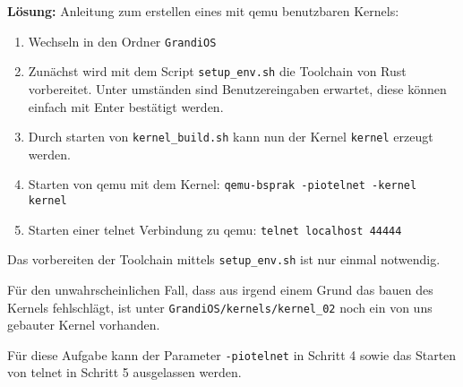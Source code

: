 \begin{description}
\textbf{Lösung:}
Anleitung zum erstellen eines mit qemu benutzbaren Kernels:
\begin{enumerate}
	\item Wechseln in den Ordner \texttt{GrandiOS}
	\item Zunächst wird mit dem Script \texttt{setup\_env.sh} die Toolchain von Rust vorbereitet. Unter umständen sind Benutzereingaben erwartet, diese können einfach mit Enter bestätigt werden.
	\item Durch starten von \texttt{kernel\_build.sh} kann nun der Kernel \texttt{kernel} erzeugt werden.
	\item Starten von qemu mit dem Kernel: \texttt{qemu-bsprak -piotelnet -kernel kernel}
	\item Starten einer telnet Verbindung zu qemu: \texttt{telnet localhost 44444}
\end{enumerate}
Das vorbereiten der Toolchain mittels \texttt{setup\_env.sh} ist nur einmal notwendig.

Für den unwahrscheinlichen Fall, dass aus irgend einem Grund das bauen des Kernels fehlschlägt, ist unter \texttt{GrandiOS/kernels/kernel\_02} noch ein von uns gebauter Kernel vorhanden.

Für diese Aufgabe kann der Parameter \texttt{-piotelnet} in Schritt 4 sowie das Starten von telnet in Schritt 5 ausgelassen werden.


\end{description}
